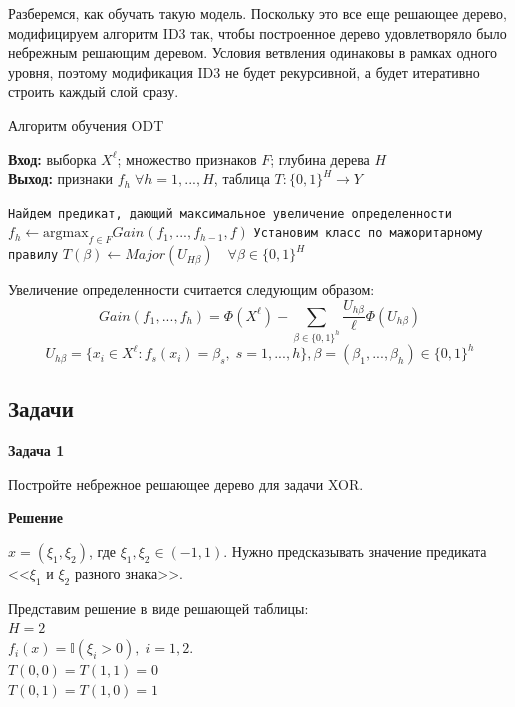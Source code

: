Разберемся, как обучать такую модель. Поскольку это все еще решающее дерево, модифицируем алгоритм ID3 так, чтобы построенное
дерево удовлетворяло было небрежным решающим деревом. Условия ветвления одинаковы в рамках одного уровня, поэтому модификация
ID3 не будет рекурсивной, а будет итеративно строить каждый слой сразу.

\begin{algorithm}
\caption{Алгоритм обучения ODT}\label{alg:cap}
\hspace*{\algorithmicindent} \textbf{Вход:} выборка $X^{\ell}$; множество признаков $F$; глубина дерева $H$ \\ 
\hspace*{\algorithmicindent} \textbf{Выход:} признаки $f_h \; \forall h=1,...,H$, таблица $T: \{0, 1\}^H \rightarrow Y$
\begin{algorithmic}
        \State \texttt{Найдем предикат, дающий максимальное увеличение определенности}
        \State $ f_h \gets \text{argmax}_{f \in F} Gain(f_1, ..., f_{h-1}, f)$
    \EndFor
    \State \texttt{Установим класс по мажоритарному правилу}
    \State $ T(\beta) \gets Major(U_{H\beta}) \quad \forall \beta \in \{0, 1\}^H$
\end{algorithmic}
\end{algorithm}

Увеличение определенности считается следующим образом:
\begin{equation*}
    Gain(f_1, ..., f_h) = \Phi(X^{\ell}) - \sum\limits_{\beta\in \{0, 1\}^h}\frac{U_{h\beta}}{\ell}\Phi(U_{h\beta}) 
\end{equation*}
\begin{equation*}
    U_{h\beta} = \{x_i\in X^{\ell}: f_s(x_i)=\beta_s, \; s=1,...,h\}, \beta=(\beta_1, ...,\beta_h)\in\{0, 1\}^h
\end{equation*}

\subsection{Задачи}

\textbf{Задача 1}

Постройте небрежное решающее дерево для задачи XOR.

\textbf{Решение}

$ x = (\xi_1, \xi_2) $, где $ \xi_1, \xi_2\in(-1, 1) $.
Нужно предсказывать значение предиката <<$\xi_1$ и $\xi_2$ разного знака>>.

Представим решение в виде решающей таблицы: \\
$H = 2$ \\
$ f_i(x) = \mathbb{I}(\xi_i > 0), \; i = 1, 2 $. \\
$T(0, 0) = T(1, 1) = 0$ \\
$T(0, 1) = T(1, 0) = 1$

